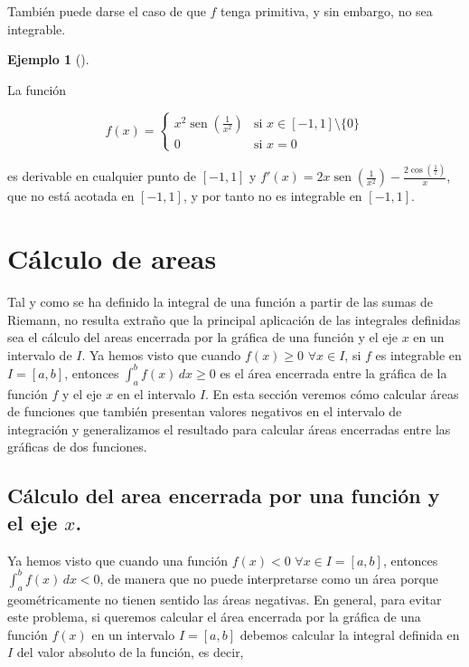 \documentclass[
  a4paper,
]{scrreport}
\theoremstyle{plain}
\theoremstyle{definition}
\theoremstyle{plain}
\theoremstyle{plain}
\theoremstyle{definition}
\newtheorem{example}{Ejemplo}[chapter]
\theoremstyle{definition}
\theoremstyle{remark}
\begin{document}
También puede darse el caso de que \(f\) tenga primitiva, y sin embargo,
no sea integrable.

\begin{example}[]\protect\hypertarget{exm-funcion-no-integrable-con-primitiva}{}\label{exm-funcion-no-integrable-con-primitiva}

La función

\[
f(x)=
\begin{cases}
x^2\operatorname{sen}\left(\frac{1}{x^2}\right) & \mbox{si $x\in[-1,1]\setminus\{0\}$}\\
0 & \mbox{si $x=0$}
\end{cases}
\]

es derivable en cualquier punto de \([-1,1]\) y
\(f'(x) = 2x\operatorname{sen}\left(\frac{1}{x^2}\right)-\frac{2\cos\left(\frac{1}{^2}\right)}{x}\),
que no está acotada en \([-1,1]\), y por tanto no es integrable en
\([-1,1]\).

\end{example}

\section{Cálculo de areas}\label{cuxe1lculo-de-areas}

Tal y como se ha definido la integral de una función a partir de las
sumas de Riemann, no resulta extraño que la principal aplicación de las
integrales definidas sea el cálculo del areas encerrada por la gráfica
de una función y el eje \(x\) en un intervalo de \(I\). Ya hemos visto
que cuando \(f(x)\geq 0\) \(\forall x\in I\), si \(f\) es integrable en
\(I=[a,b]\), entonces \(\int_a^b f(x)\, dx\geq 0\) es el área encerrada
entre la gráfica de la función \(f\) y el eje \(x\) en el intervalo
\(I\). En esta sección veremos cómo calcular áreas de funciones que
también presentan valores negativos en el intervalo de integración y
generalizamos el resultado para calcular áreas encerradas entre las
gráficas de dos funciones.

\subsection{\texorpdfstring{Cálculo del area encerrada por una función y
el eje
\(x\).}{Cálculo del area encerrada por una función y el eje x.}}\label{sec-calculo-area-funcion-ejex}

Ya hemos visto que cuando una función \(f(x)<0\)
\(\forall x\in I=[a,b]\), entonces \(\int_a^b f(x)\, dx<0\), de manera
que no puede interpretarse como un área porque geométricamente no tienen
sentido las áreas negativas. En general, para evitar este problema, si
queremos calcular el área encerrada por la gráfica de una función
\(f(x)\) en un intervalo \(I=[a,b]\) debemos calcular la integral
definida en \(I\) del valor absoluto de la función, es decir,
\end{document}
